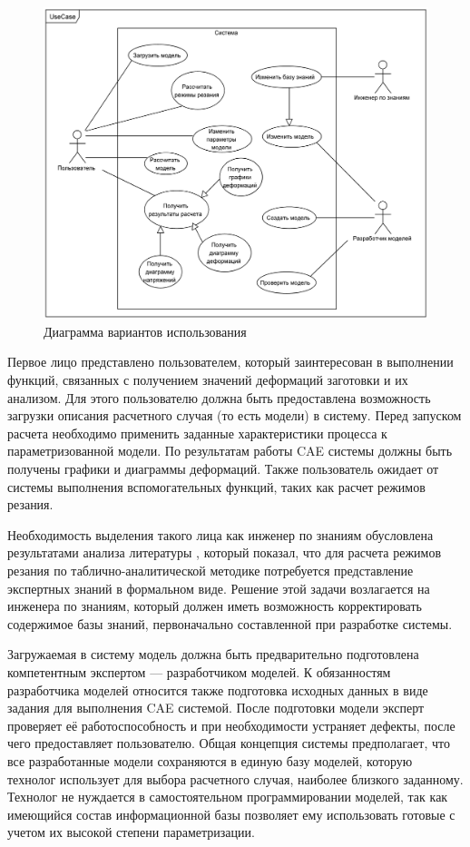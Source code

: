 \documentclass[14pt,oneside,final]{extreport}
\begin{document}
		\begin{figure}[!h]
		\begin{center}
		\includegraphics[scale=0.095]{img/ucd} 
		\end{center}
		\caption{Диаграмма вариантов использования}
		\label{fig:ucd}
		\end{figure}
		
	Первое лицо представлено пользователем, который заинтересован в выполнении функций, связанных с получением значений деформаций заготовки и их анализом. Для этого пользователю должна быть предоставлена возможность загрузки описания расчетного случая (то есть модели) в систему. Перед запуском расчета необходимо применить заданные характеристики процесса к параметризованной модели. По результатам работы CAE системы должны быть получены графики и диаграммы деформаций. Также пользователь ожидает от системы выполнения вспомогательных функций, таких как расчет режимов резания. 
	
	Необходимость выделения такого лица как инженер по знаниям обусловлена результатами анализа литературы \cite{book:Kosilova}, который показал, что для расчета режимов резания по таблично-аналитической методике потребуется представление экспертных знаний в формальном виде. Решение этой задачи возлагается на инженера по знаниям, который должен иметь возможность корректировать содержимое базы знаний, первоначально составленной при разработке системы.  

	Загружаемая в систему модель должна быть предварительно подготовлена компетентным экспертом --- разработчиком моделей. К обязанностям разработчика моделей относится также подготовка исходных данных в виде задания для выполнения CAE системой. После подготовки модели эксперт проверяет её работоспособность и при необходимости  устраняет дефекты, после чего предоставляет пользователю. Общая концепция системы предполагает, что все разработанные модели сохраняются в единую базу моделей, которую технолог использует для выбора расчетного случая, наиболее близкого заданному. Технолог не нуждается в самостоятельном программировании моделей, так как имеющийся состав информационной базы позволяет ему использовать готовые с учетом их высокой степени параметризации. 
	
\end{document}

